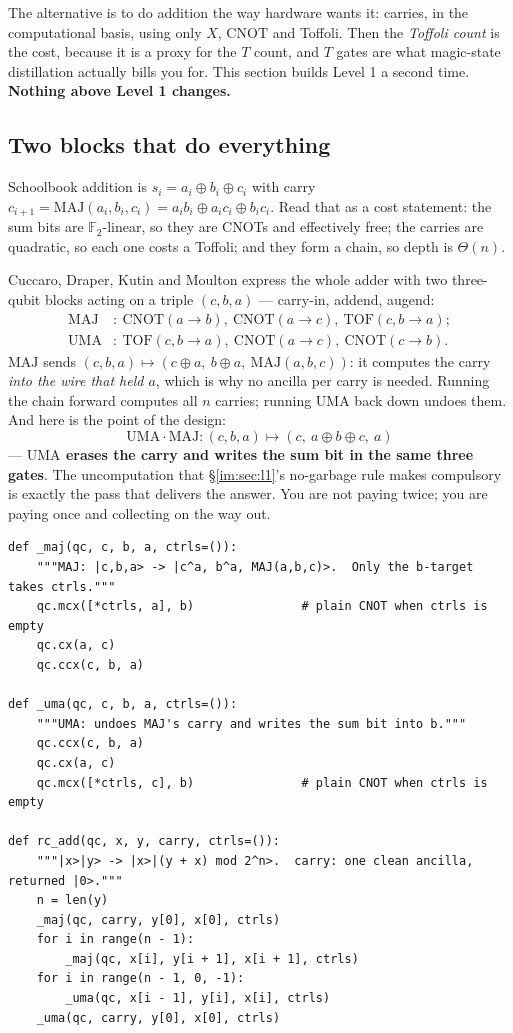 \documentclass[11pt]{article}
\newcommand{\CNOT}{\mathrm{CNOT}}
\theoremstyle{plain}
\theoremstyle{remark}
\begin{document}
The alternative is to do addition the way hardware wants it: carries, in the computational basis,
using only $X$, $\CNOT$ and Toffoli. Then the \emph{Toffoli count} is the cost, because it is a
proxy for the $T$ count, and $T$ gates are what magic-state distillation actually bills you for.
This section builds Level 1 a second time. \textbf{Nothing above Level 1 changes.}

\subsection{Two blocks that do everything}

Schoolbook addition is $s_i=a_i\oplus b_i\oplus c_i$ with carry
$c_{i+1}=\mathrm{MAJ}(a_i,b_i,c_i)=a_ib_i\oplus a_ic_i\oplus b_ic_i$. Read that as a cost statement:
the sum bits are $\mathbb F_2$-linear, so they are CNOTs and effectively free; the carries are
quadratic, so each one costs a Toffoli; and they form a chain, so depth is $\Theta(n)$.

Cuccaro, Draper, Kutin and Moulton \cite{cuccaro} express the whole adder with two three-qubit
blocks acting on a triple $(c,b,a)$ --- carry-in, addend, augend:
\begin{align*}
\mathrm{MAJ}&:\ \CNOT(a\!\to\!b),\ \CNOT(a\!\to\!c),\ \mathrm{TOF}(c,b\!\to\!a);\\
\mathrm{UMA}&:\ \mathrm{TOF}(c,b\!\to\!a),\ \CNOT(a\!\to\!c),\ \CNOT(c\!\to\!b).
\end{align*}
$\mathrm{MAJ}$ sends $(c,b,a)\mapsto(c\oplus a,\ b\oplus a,\ \mathrm{MAJ}(a,b,c))$: it computes the
carry \emph{into the wire that held $a$}, which is why no ancilla per carry is needed. Running the
chain forward computes all $n$ carries; running $\mathrm{UMA}$ back down undoes them. And here is
the point of the design:
\[
\mathrm{UMA}\cdot\mathrm{MAJ}:(c,b,a)\mapsto(c,\ a\oplus b\oplus c,\ a)
\]
--- \textbf{$\mathrm{UMA}$ erases the carry and writes the sum bit in the same three gates}. The
uncomputation that \S\ref{im:sec:l1}'s no-garbage rule makes compulsory is exactly the pass that
delivers the answer. You are not paying twice; you are paying once and collecting on the way out.

\begin{lstlisting}
def _maj(qc, c, b, a, ctrls=()):
    """MAJ: |c,b,a> -> |c^a, b^a, MAJ(a,b,c)>.  Only the b-target takes ctrls."""
    qc.mcx([*ctrls, a], b)               # plain CNOT when ctrls is empty
    qc.cx(a, c)
    qc.ccx(c, b, a)

def _uma(qc, c, b, a, ctrls=()):
    """UMA: undoes MAJ's carry and writes the sum bit into b."""
    qc.ccx(c, b, a)
    qc.cx(a, c)
    qc.mcx([*ctrls, c], b)               # plain CNOT when ctrls is empty

def rc_add(qc, x, y, carry, ctrls=()):
    """|x>|y> -> |x>|(y + x) mod 2^n>.  carry: one clean ancilla, returned |0>."""
    n = len(y)
    _maj(qc, carry, y[0], x[0], ctrls)
    for i in range(n - 1):
        _maj(qc, x[i], y[i + 1], x[i + 1], ctrls)
    for i in range(n - 1, 0, -1):
        _uma(qc, x[i - 1], y[i], x[i], ctrls)
    _uma(qc, carry, y[0], x[0], ctrls)
\end{lstlisting}
\end{document}
